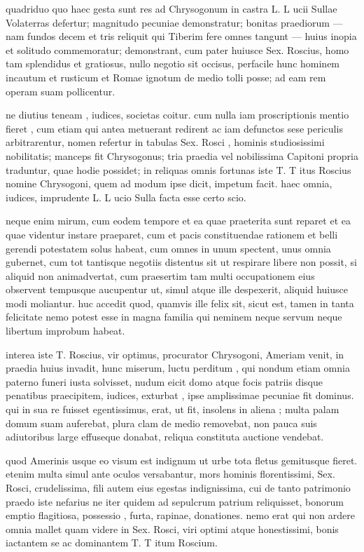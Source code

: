  quadriduo quo haec gesta sunt res ad Chrysogonum in castra L. L ucii Sullae Volaterras defertur; magnitudo pecuniae demonstratur; bonitas praediorum — nam fundos decem et tris reliquit qui Tiberim fere omnes tangunt — huius inopia et solitudo commemoratur; demonstrant, cum pater huiusce Sex. Roscius, homo tam splendidus et gratiosus, nullo negotio sit occisus, perfacile hunc hominem incautum et rusticum et Romae ignotum de medio tolli posse; ad eam rem operam suam pollicentur.

 ne diutius teneam , iudices, societas coitur. cum nulla iam proscriptionis mentio fieret , cum etiam qui antea metuerant redirent ac iam defunctos sese periculis arbitrarentur, nomen refertur in tabulas Sex. Rosci , hominis studiosissimi nobilitatis; manceps fit Chrysogonus; tria praedia vel nobilissima Capitoni propria traduntur, quae hodie possidet; in reliquas omnis fortunas iste T. T itus Roscius nomine Chrysogoni, quem ad modum ipse dicit, impetum facit. haec omnia, iudices, imprudente L. L ucio Sulla facta esse certo scio.

 neque enim mirum, cum eodem tempore et ea quae praeterita sunt reparet et ea quae videntur instare praeparet, cum et pacis constituendae rationem et belli gerendi potestatem solus habeat, cum omnes in unum spectent, unus omnia gubernet, cum tot tantisque negotiis distentus sit ut respirare libere non possit, si aliquid non animadvertat, cum praesertim tam multi occupationem eius observent tempusque aucupentur ut, simul atque ille despexerit, aliquid huiusce modi moliantur. huc accedit quod, quamvis ille felix sit, sicut est, tamen in tanta felicitate nemo potest esse in magna familia qui neminem neque servum neque libertum improbum habeat.

 interea iste T. Roscius, vir optimus, procurator Chrysogoni, Ameriam venit, in praedia huius invadit, hunc miserum, luctu perditum , qui nondum etiam omnia paterno funeri iusta solvisset, nudum eicit domo atque focis patriis disque penatibus praecipitem, iudices, exturbat , ipse amplissimae pecuniae fit dominus. qui in sua re fuisset egentissimus, erat, ut fit, insolens in aliena ; multa palam domum suam auferebat, plura clam de medio removebat, non pauca suis adiutoribus large effuseque donabat, reliqua constituta auctione vendebat.

 quod Amerinis usque eo visum est indignum ut urbe tota fletus gemitusque fieret. etenim multa simul ante oculos versabantur, mors hominis florentissimi, Sex. Rosci, crudelissima, fili autem eius egestas indignissima, cui de tanto patrimonio praedo iste nefarius ne iter quidem ad sepulcrum patrium reliquisset, bonorum emptio flagitiosa, possessio , furta, rapinae, donationes. nemo erat qui non ardere omnia mallet quam videre in Sex. Rosci, viri optimi atque honestissimi, bonis iactantem se ac dominantem T. T itum Roscium.

